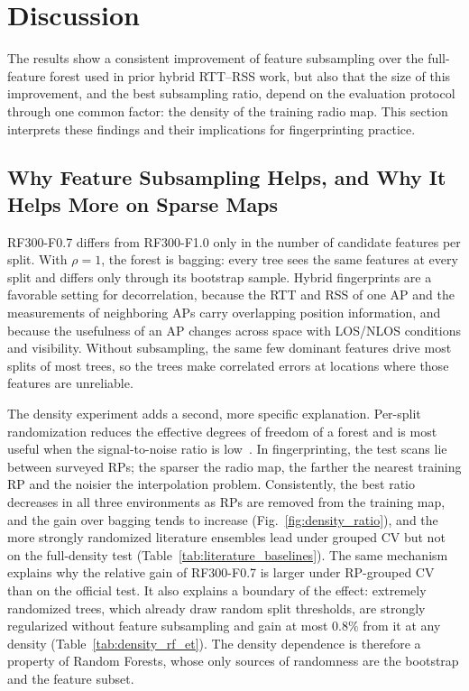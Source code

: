 \section{Discussion}
\label{sec:discussion}

The results show a consistent improvement of feature subsampling over the full-feature forest used in prior hybrid RTT--RSS work, but also that the size of this improvement, and the best subsampling ratio, depend on the evaluation protocol through one common factor: the density of the training radio map. This section interprets these findings and their implications for fingerprinting practice.

\subsection{Why Feature Subsampling Helps, and Why It Helps More on Sparse Maps}
\label{subsec:discussion_subspace}

RF300-F0.7 differs from RF300-F1.0 only in the number of candidate features per split. With $\rho=1$, the forest is bagging: every tree sees the same features at every split and differs only through its bootstrap sample. Hybrid fingerprints are a favorable setting for decorrelation, because the RTT and RSS of one AP and the measurements of neighboring APs carry overlapping position information, and because the usefulness of an AP changes across space with LOS/NLOS conditions and visibility. Without subsampling, the same few dominant features drive most splits of most trees, so the trees make correlated errors at locations where those features are unreliable.

The density experiment adds a second, more specific explanation. Per-split randomization reduces the effective degrees of freedom of a forest and is most useful when the signal-to-noise ratio is low~\cite{mentch2020randomization}. In fingerprinting, the test scans lie between surveyed RPs; the sparser the radio map, the farther the nearest training RP and the noisier the interpolation problem. Consistently, the best ratio decreases in all three environments as RPs are removed from the training map, and the gain over bagging tends to increase (Fig.~\ref{fig:density_ratio}), and the more strongly randomized literature ensembles lead under grouped CV but not on the full-density test (Table~\ref{tab:literature_baselines}). The same mechanism explains why the relative gain of RF300-F0.7 is larger under RP-grouped CV than on the official test. It also explains a boundary of the effect: extremely randomized trees, which already draw random split thresholds, are strongly regularized without feature subsampling and gain at most $0.8\%$ from it at any density (Table~\ref{tab:density_rf_et}). The density dependence is therefore a property of Random Forests, whose only sources of randomness are the bootstrap and the feature subset.


